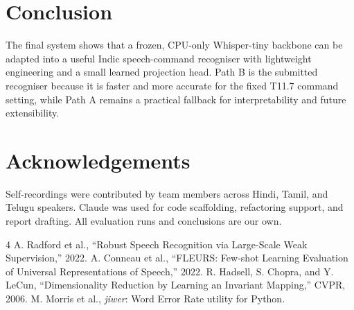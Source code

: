 \documentclass[11pt]{article}
\begin{document}
\section{Conclusion}

The final system shows that a frozen, CPU-only Whisper-tiny backbone can be
adapted into a useful Indic speech-command recogniser with lightweight
engineering and a small learned projection head. Path B is the submitted
recogniser because it is faster and more accurate for the fixed T11.7 command
setting, while Path A remains a practical fallback for interpretability and
future extensibility.

\section*{Acknowledgements}

Self-recordings were contributed by team members across Hindi, Tamil, and
Telugu speakers. Claude was used for code scaffolding, refactoring support,
and report drafting. All evaluation runs and conclusions are our own.

\begin{thebibliography}{4}
A. Radford et al., ``Robust Speech Recognition via Large-Scale Weak
Supervision,'' 2022.
A. Conneau et al., ``FLEURS: Few-shot Learning Evaluation of Universal
Representations of Speech,'' 2022.
R. Hadsell, S. Chopra, and Y. LeCun, ``Dimensionality Reduction by Learning
an Invariant Mapping,'' CVPR, 2006.
M. Morris et al., \textit{jiwer}: Word Error Rate utility for Python.
\end{thebibliography}
\end{document}
